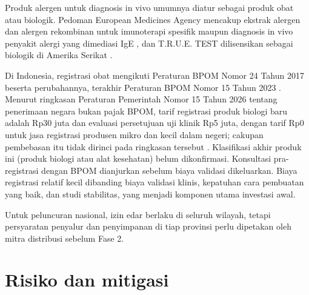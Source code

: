 \documentclass[11pt,a4paper]{article}
\begin{document}
Produk alergen untuk diagnosis in vivo umumnya diatur sebagai produk obat atau biologik. Pedoman European Medicines Agency mencakup ekstrak alergen dan alergen rekombinan untuk imunoterapi spesifik maupun diagnosis in vivo penyakit alergi yang dimediasi IgE \cite{ema}, dan T.R.U.E. TEST dilisensikan sebagai biologik di Amerika Serikat \cite{fda}.

Di Indonesia, registrasi obat mengikuti Peraturan BPOM Nomor 24 Tahun 2017 beserta perubahannya, terakhir Peraturan BPOM Nomor 15 Tahun 2023 \cite{hukumonline}. Menurut ringkasan Peraturan Pemerintah Nomor 15 Tahun 2026 tentang penerimaan negara bukan pajak BPOM, tarif registrasi produk biologi baru adalah Rp30 juta dan evaluasi persetujuan uji klinik Rp5 juta, dengan tarif Rp0 untuk jasa registrasi produsen mikro dan kecil dalam negeri; cakupan pembebasan itu tidak dirinci pada ringkasan tersebut \cite{pp15}. Klasifikasi akhir produk ini (produk biologi atau alat kesehatan) belum dikonfirmasi. Konsultasi pra-registrasi dengan BPOM dianjurkan sebelum biaya validasi dikeluarkan. Biaya registrasi relatif kecil dibanding biaya validasi klinis, kepatuhan cara pembuatan yang baik, dan studi stabilitas, yang menjadi komponen utama investasi awal.

Untuk peluncuran nasional, izin edar berlaku di seluruh wilayah, tetapi persyaratan penyalur dan penyimpanan di tiap provinsi perlu dipetakan oleh mitra distribusi sebelum Fase 2.

\section{Risiko dan mitigasi}
\end{document}
